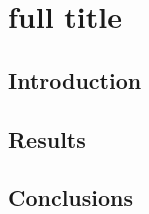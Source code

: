 
\chapter[short title]{full title}
\label{ch:letter1}

\graphicspath{{./../gfx/Letter1/}}


\begin{abstract}
    \lipsum[1]
\end{abstract}

\section{Introduction}
    \lipsum

\section{Results}
    \lipsum

\section{Conclusions} 
    \lipsum[2]
	

